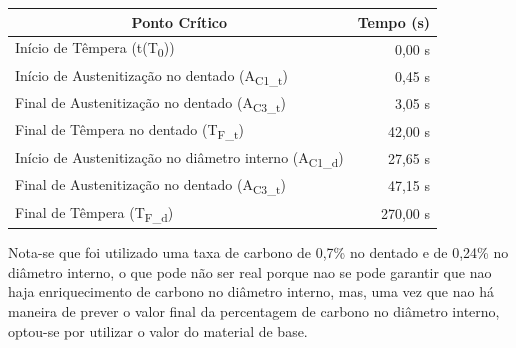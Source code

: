 \begin{table}[htb]
    \centering
    \label{tab:pontos_sim}
    \begin{tabular}{lr} 
    \toprule
    \multicolumn{1}{c}{\textbf{Ponto Crítico}}            & \multicolumn{1}{c}{\textbf{Tempo (s)}}                         \\ 
    \hline\hline
    Início de Têmpera (t(T\textsubscript{0}))                             & 0,00 s                                         \\ 
    \hline
    Início de Austenitização no dentado (A\textsubscript{C1\_t})          & 0,45 s                                         \\
    Final de Austenitização no dentado (A\textsubscript{C3\_t})           & 3,05 s                                         \\
    Final de Têmpera no dentado (T\textsubscript{F\_t})                   & 42,00 s                                        \\ 
    \hline\hline
    Início de Austenitização no diâmetro interno (A\textsubscript{C1\_d}) & 27,65 s                                        \\
    Final de Austenitização no dentado (A\textsubscript{C3\_t})           & 47,15 s                                        \\ 
    Final de Têmpera (T\textsubscript{F\_d})                              & 270,00 s                                       \\
    \bottomrule
    \end{tabular}
\end{table}
\par Nota-se que foi utilizado uma taxa de carbono de 0,7\% no dentado e de 0,24\% no diâmetro interno, o que pode não ser real porque nao se pode garantir que nao haja enriquecimento de carbono no diâmetro interno, mas, uma vez que nao há maneira de prever o valor final da percentagem de carbono no diâmetro interno, optou-se por utilizar o valor do material de base.